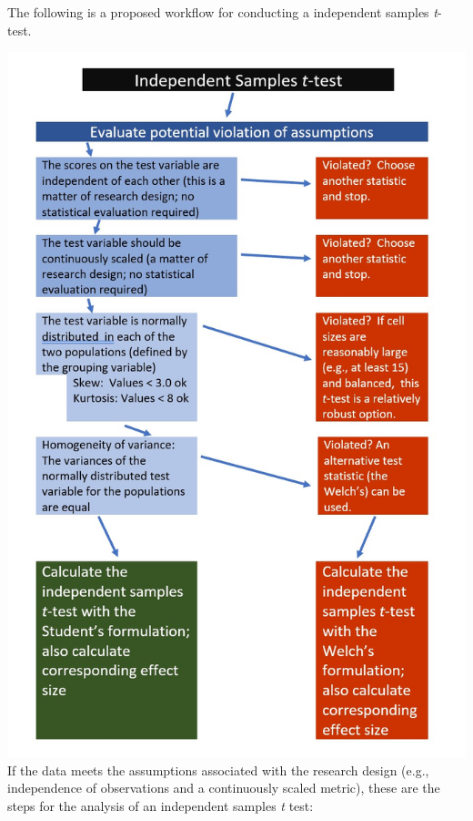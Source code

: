 \documentclass[
  11pt,
]{book}
\begin{document}
The following is a proposed workflow for conducting a independent samples \emph{t}-test.

\includegraphics{images/ttests/IndSampleWrkFlw.jpg}
If the data meets the assumptions associated with the research design (e.g., independence of observations and a continuously scaled metric), these are the steps for the analysis of an independent samples \emph{t} test:
\end{document}
